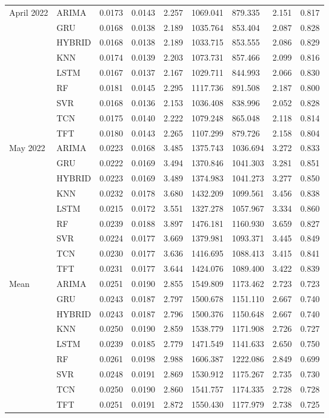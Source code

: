 \begin{tabular}{lllllllll}
April 2022 & ARIMA & 0.0173 & 0.0143 & 2.257 & 1069.041 & 879.335 & 2.151 & 0.817 \\
 & GRU & 0.0168 & 0.0138 & 2.189 & 1035.764 & 853.404 & 2.087 & 0.828 \\
 & HYBRID & 0.0168 & 0.0138 & 2.189 & 1033.715 & 853.555 & 2.086 & 0.829 \\
 & KNN & 0.0174 & 0.0139 & 2.203 & 1073.731 & 857.466 & 2.099 & 0.816 \\
 & LSTM & 0.0167 & 0.0137 & 2.167 & 1029.711 & 844.993 & 2.066 & 0.830 \\
 & RF & 0.0181 & 0.0145 & 2.295 & 1117.736 & 891.508 & 2.187 & 0.800 \\
 & SVR & 0.0168 & 0.0136 & 2.153 & 1036.408 & 838.996 & 2.052 & 0.828 \\
 & TCN & 0.0175 & 0.0140 & 2.222 & 1079.248 & 865.048 & 2.118 & 0.814 \\
 & TFT & 0.0180 & 0.0143 & 2.265 & 1107.299 & 879.726 & 2.158 & 0.804 \\
May 2022 & ARIMA & 0.0223 & 0.0168 & 3.485 & 1375.743 & 1036.694 & 3.272 & 0.833 \\
 & GRU & 0.0222 & 0.0169 & 3.494 & 1370.846 & 1041.303 & 3.281 & 0.851 \\
 & HYBRID & 0.0223 & 0.0169 & 3.489 & 1374.983 & 1041.273 & 3.277 & 0.850 \\
 & KNN & 0.0232 & 0.0178 & 3.680 & 1432.209 & 1099.561 & 3.456 & 0.838 \\
 & LSTM & 0.0215 & 0.0172 & 3.551 & 1327.278 & 1057.967 & 3.334 & 0.860 \\
 & RF & 0.0239 & 0.0188 & 3.897 & 1476.181 & 1160.930 & 3.659 & 0.827 \\
 & SVR & 0.0224 & 0.0177 & 3.669 & 1379.981 & 1093.371 & 3.445 & 0.849 \\
 & TCN & 0.0230 & 0.0177 & 3.636 & 1416.695 & 1088.413 & 3.415 & 0.841 \\
 & TFT & 0.0231 & 0.0177 & 3.644 & 1424.076 & 1089.400 & 3.422 & 0.839 \\
Mean & ARIMA & 0.0251 & 0.0190 & 2.855 & 1549.809 & 1173.462 & 2.723 & 0.723 \\
 & GRU & 0.0243 & 0.0187 & 2.797 & 1500.678 & 1151.110 & 2.667 & 0.740 \\
 & HYBRID & 0.0243 & 0.0187 & 2.796 & 1500.376 & 1150.648 & 2.667 & 0.740 \\
 & KNN & 0.0250 & 0.0190 & 2.859 & 1538.779 & 1171.908 & 2.726 & 0.727 \\
 & LSTM & 0.0239 & 0.0185 & 2.779 & 1471.549 & 1141.633 & 2.650 & 0.750 \\
 & RF & 0.0261 & 0.0198 & 2.988 & 1606.387 & 1222.086 & 2.849 & 0.699 \\
 & SVR & 0.0248 & 0.0191 & 2.869 & 1530.912 & 1175.267 & 2.735 & 0.730 \\
 & TCN & 0.0250 & 0.0190 & 2.860 & 1541.757 & 1174.335 & 2.728 & 0.728 \\
 & TFT & 0.0251 & 0.0191 & 2.872 & 1550.430 & 1177.979 & 2.738 & 0.725 \\
\bottomrule
\end{tabular}
